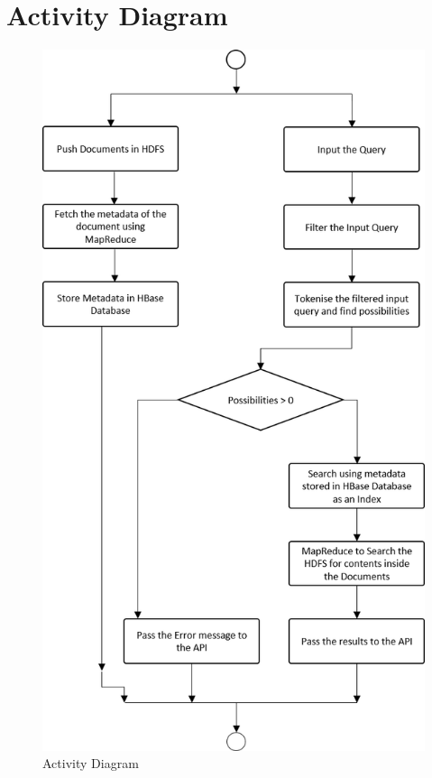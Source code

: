 \section{Activity Diagram}
\begin{figure}[h]
\begin{center}
\includegraphics[scale=0.8]{activity_diagram}
\end{center}
\caption{Activity Diagram}
\end{figure}

